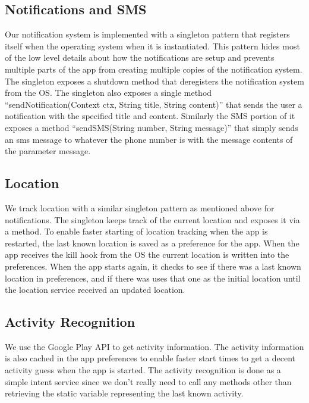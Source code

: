 \subsection{Notifications and SMS}
Our notification system is implemented with a singleton pattern that registers itself when the operating system when it is instantiated. This pattern hides most of the low level details about how the notifications are setup and prevents multiple parts of the app from creating multiple copies of the notification system. The singleton exposes a shutdown method that deregisters the notification system from the OS. The singleton also exposes a single method “sendNotification(Context ctx, String title, String content)” that sends the user a notification with the specified title and content. Similarly the SMS portion of it exposes a method “sendSMS(String number, String message)” that simply sends an sms message to whatever the phone number is with the message contents of the parameter message.

\subsection{Location}
We track location with a similar singleton pattern as mentioned above for notifications. The singleton keeps track of the current location and exposes it via a method. To enable faster starting of location tracking when the app is restarted, the last known location is saved as a preference for the app. When the app receives the kill hook from the OS the current location is written into the preferences. When the app starts again, it checks to see if there was a last known location in preferences, and if there was uses that one as the initial location until the location service received an updated location.

\subsection{Activity Recognition}
We use the Google Play API to get activity information. The activity information is also cached in the app preferences to enable faster start times to get a decent activity guess when the app is started. The activity recognition is done as a simple intent service since we don't really need to call any methods other than retrieving the static variable representing the last known activity.

